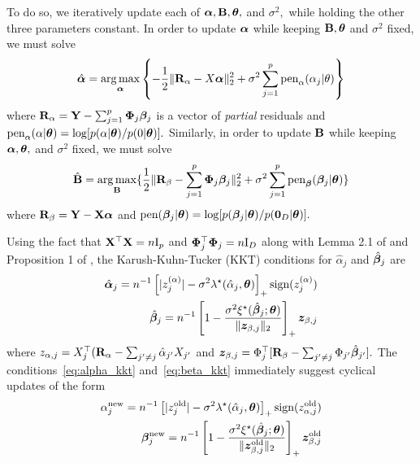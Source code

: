 To do so, we iteratively update each of $\boldsymbol{\alpha}, \mathbf{B}, \boldsymbol{\theta},$ and $\sigma^{2},$ while holding the other three parameters constant.
In order to update $\boldsymbol{\alpha}$ while keeping $\mathbf{B}, \boldsymbol{\theta}$ and $\sigma^{2}$ fixed, we must solve
\begin{equation}
\label{eq:alpha_maximization}
\hat{\boldsymbol{\alpha}} = \operatorname*{arg\,max}_{\boldsymbol{\alpha}}\left\{-\frac{1}{2}\lVert \mathbf{R}_{\alpha} - X\boldsymbol{\alpha} \rVert_{2}^{2} + \sigma^{2}\sum_{j = 1}^{p}{\text{pen}_{\alpha}(\alpha_{j} \vert \theta)}\right\}
\end{equation}
where $\mathbf{R}_{\alpha} = \mathbf{Y} - \sum_{j = 1}^{p}{\boldsymbol{\Phi}_{j}\boldsymbol{\beta}_{j}}$ is a vector of \textit{partial} residuals and $\text{pen}_{\alpha}(\alpha \vert \boldsymbol{\theta}) = \log[p(\alpha\vert\boldsymbol{\theta})/p(0\vert\boldsymbol{\theta})].$
Similarly, in order to update $\mathbf{B}$ while keeping $\boldsymbol{\alpha}, \boldsymbol{\theta},$ and $\sigma^{2}$ fixed, we must solve
\begin{equation}
\label{eq:beta_maximization}
\hat{\mathbf{B}} = \operatorname*{arg\,max}_{\mathbf{B}}\{\frac{1}{2}\lVert \mathbf{R}_{\beta} - \sum_{j = 1}^{p}{\boldsymbol{\Phi}_{j}\boldsymbol{\beta}_{j}} \rVert_{2}^{2} + \sigma^{2}\sum_{j = 1}^{p}{\text{pen}_{\boldsymbol{\beta}}(\boldsymbol{\beta}_{j} \vert \boldsymbol{\theta})} \}
\end{equation}
where $\mathbf{R}_{\beta} = \mathbf{Y} - \mathbf{X} \boldsymbol{\alpha}$ and $\text{pen}(\boldsymbol{\beta}_{j} \vert \boldsymbol{\theta}) = \log[p(\boldsymbol{\beta}_{j} \vert \boldsymbol{\theta})/p(\mathbf{0}_{D}\lvert \boldsymbol{\theta})].$

Using the fact that $\mathbf{X}^{\top}\mathbf{X} = n\text{I}_{p}$ and $\boldsymbol{\Phi}_{j}^{\top}\boldsymbol{\Phi}_{j} = n\text{I}_{D}$ along with Lemma 2.1 of \citet{RockovaGeorge2018} and Proposition 1 of \citet{Bai2020}, the Karush-Kuhn-Tucker (KKT) conditions for $\hat{\alpha}_{j}$ and $\hat{\boldsymbol{\beta}}_{j}$ are
\begin{align}
\label{eq:alpha_kkt}
\hat{\boldsymbol{\alpha}}_{j} = n^{-1}\left[ \lvert z^{(\alpha)}_{j} \rvert - \sigma^{2}\lambda^{\star}(\hat{\alpha}_{j}, \boldsymbol{\theta}) \right]_{+}\text{sign}(z^{(\alpha)}_{j}) \\
\label{eq:beta_kkt}
\hat{\boldsymbol{\beta}}_{j} = n^{-1}\left[1 - \frac{\sigma^{2}\xi^{\star}(\hat{\boldsymbol{\beta}}_{j}; \boldsymbol{\theta})}{\lVert \bm{z}_{\beta,j} \rVert_{2}}\right]_{+}\bm{z}_{\beta,j}
\end{align}
where $z_{\alpha,j} = X_{j}^{\top}(\mathbf{R}_{\alpha} - \sum_{j' \neq j}{\hat{\alpha}_{j'}X_{j'}}$ and $\bm{z}_{\beta,j} = \Phi_{j}^{\top}[\mathbf{R}_{\beta} - \sum_{j' \neq j}{\Phi_{j'}\hat{\boldsymbol{\beta}}_{j'}}].$
The conditions~\eqref{eq:alpha_kkt} and~\eqref{eq:beta_kkt} immediately suggest cyclical updates of the form
\begin{align}
\alpha^{\text{new}}_{j} = n^{-1}\left[ \lvert z^{\text{old}}_{j} \rvert - \sigma^{2}\lambda^{\star}(\hat{\alpha}_{j}, \boldsymbol{\theta}) \right]_{+}\text{sign}(z^{\text{old}}_{\alpha,j}) \label{eq:alpha_update} \\
\boldsymbol{\beta}_{j}^{\text{new}} = n^{-1}\left[1 - \frac{\sigma^{2}\xi^{\star}(\hat{\boldsymbol{\beta}}_{j}; \boldsymbol{\theta})}{\lVert \bm{z}^{\text{old}}_{\beta,j} \rVert_{2}}\right]_{+}\bm{z}^{\text{old}}_{\beta,j} \label{eq:beta_update}
\end{align}

